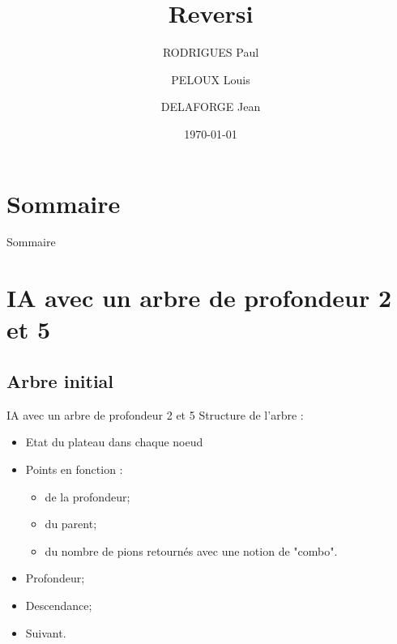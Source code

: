 \documentclass{beamer}
\title{Reversi}
\author{RODRIGUES Paul \and PELOUX Louis \and DELAFORGE Jean }
\date{\today}
\begin{document}
\maketitle

\section{Sommaire}
\begin{frame}{Sommaire}
    \tableofcontents
\end{frame}

\section{IA avec un arbre de profondeur 2 et 5}
\subsection{Arbre initial}
\begin{frame}{IA avec un arbre de profondeur 2 et 5}
    Structure de l'arbre : \begin{itemize}
        \item Etat du plateau dans chaque noeud
        \item Points en fonction :
        \begin{itemize}
            \item de la profondeur;
            \item du parent;
            \item du nombre de pions retournés avec une notion de "combo".
        \end{itemize}
        \item Profondeur;
        \item Descendance;
        \item Suivant.
    \end{itemize}
\end{frame}
\end{document}
